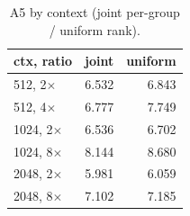 \documentclass{article}
\begin{document}
\begin{table}[htbp]
  \centering
  \caption{A5 by context (joint per-group / uniform rank).}
  \begin{tabular}{lrr}
    \toprule
    ctx, ratio & joint & uniform \\
    \midrule
    512, 2$\times$  & 6.532 & 6.843 \\
    512, 4$\times$  & 6.777 & 7.749 \\
    1024, 2$\times$ & 6.536 & 6.702 \\
    1024, 8$\times$ & 8.144 & 8.680 \\
    2048, 2$\times$ & 5.981 & 6.059 \\
    2048, 8$\times$ & 7.102 & 7.185 \\
    \bottomrule
  \end{tabular}
\end{table}
\end{document}
